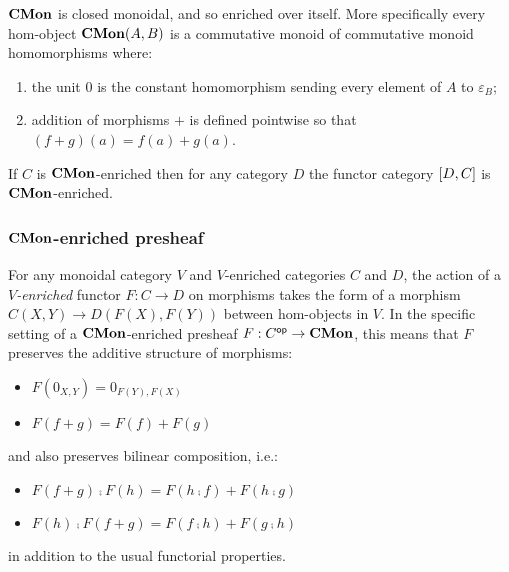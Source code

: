 $\mathbf{CMon}$ is closed monoidal, and so enriched over itself. More specifically every hom-object $\mathbf{CMon}(A,B)$ is a
commutative monoid of commutative monoid homomorphisms where:

\begin{enumerate}
\item the unit $0$ is the constant homomorphism sending every element of $A$ to $\varepsilon_B$;
\item addition of morphisms $+$ is defined pointwise so that $(f + g)(a) = f(a) + g(a)$.
\end{enumerate}

\begin{proposition}
If $C$ is $\mathbf{CMon}$-enriched then for any category $D$ the functor category $[D,C]$ is $\mathbf{CMon}$-enriched.
\end{proposition}

\subsubsection{$\mathbf{CMon}$-enriched presheaf}

For any monoidal category $V$ and $V$-enriched categories $C$ and $D$, the action of a \emph{$V$-enriched}
functor $F: C \to D$ on morphisms takes the form of a morphism $C(X,Y) \to D(F(X),F(Y))$ between hom-objects
in $V$. In the specific setting of a $\mathbf{CMon}$-enriched presheaf $F: C^{\mathsf{op}} \to \mathbf{CMon}$, this means that $F$
preserves the additive structure of morphisms:
\begin{itemize}
\item $F(0_{X,Y}) = 0_{F(Y),F(X)}$
\item $F(f + g) = F(f) + F(g)$
\end{itemize}
and also preserves bilinear composition, i.e.:
\begin{itemize}
\item $F(f + g) \comp F(h) = F(h \comp f) + F(h \comp g)$
\item $F(h) \comp F(f + g) = F(f \comp h) + F(g \comp h)$
\end{itemize}
in addition to the usual functorial properties.

